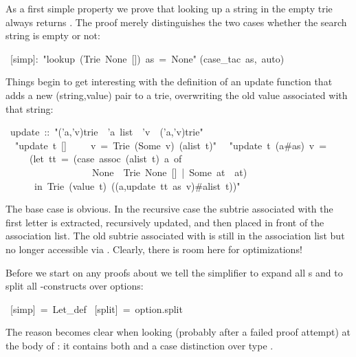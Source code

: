 \begin{isabelle}
\begin{isamarkuptext}
As a first simple property we prove that looking up a string in the empty
trie  always returns . The proof merely
distinguishes the two cases whether the search string is empty or not:%
\end{isamarkuptext}%
~[simp]:~{"}lookup~(Trie~None~[])~as~=~None{"}\isanewline
{}(case\_tac~as,~auto)%
\begin{isamarkuptext}%
Things begin to get interesting with the definition of an update function
that adds a new (string,value) pair to a trie, overwriting the old value
associated with that string:%
\end{isamarkuptext}%
~update~::~{"}('a,'v)trie~{\isasymRightarrow}~'a~list~{\isasymRightarrow}~'v~{\isasymRightarrow}~('a,'v)trie{"}\isanewline
{}\isanewline
~~{"}update~t~[]~~~~~v~=~Trie~(Some~v)~(alist~t){"}\isanewline
~~{"}update~t~(a\#as)~v~=\isanewline
~~~~~(let~tt~=~(case~assoc~(alist~t)~a~of\isanewline
~~~~~~~~~~~~~~~~~~None~{\isasymRightarrow}~Trie~None~[]~|~Some~at~{\isasymRightarrow}~at)\isanewline
~~~~~~in~Trie~(value~t)~((a,update~tt~as~v)\#alist~t)){"}%
\begin{isamarkuptext}%
\noindent
The base case is obvious. In the recursive case the subtrie
 associated with the first letter  is extracted,
recursively updated, and then placed in front of the association list.
The old subtrie associated with  is still in the association list
but no longer accessible via . Clearly, there is room here for
optimizations!

Before we start on any proofs about  we tell the simplifier to
expand all s and to split all -constructs over
options:%
\end{isamarkuptext}%
~[simp]~=~Let\_def\isanewline
{}~[split]~=~option.split%
\begin{isamarkuptext}%
\noindent
The reason becomes clear when looking (probably after a failed proof
attempt) at the body of : it contains both
 and a case distinction over type .


\end{isamarkuptext}
\end{isabelle}
